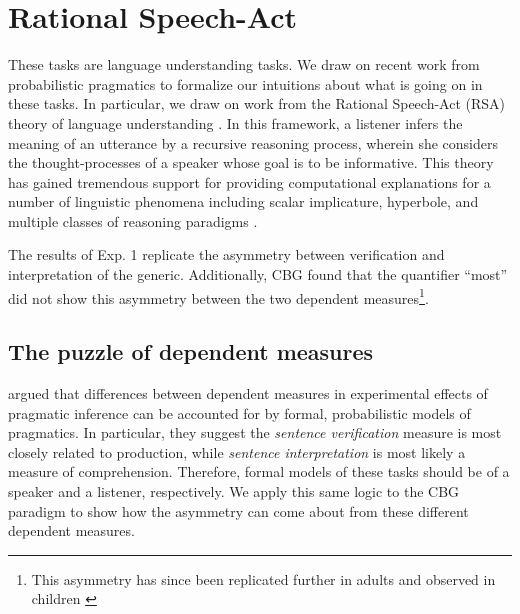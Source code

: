 \documentclass[10pt,letterpaper]{article}
\begin{document}

\section{Rational Speech-Act}


These tasks are language understanding tasks. We draw on recent work from probabilistic pragmatics to formalize our intuitions about what is going on in these tasks. In particular, we draw on work from the Rational Speech-Act (RSA) theory of language understanding \cite{Frank2012}. In this framework, a listener infers the meaning of an utterance by a recursive reasoning process, wherein she considers the thought-processes of a speaker whose goal is to be informative. This theory has gained tremendous support for providing computational explanations for a number of linguistic phenomena including scalar implicature, hyperbole, and multiple classes of reasoning paradigms \cite{Goodman2013, Kao2014, Tessler2014, Lassiter2014}. 

The results of Exp. 1 replicate the asymmetry between verification and interpretation of the generic. Additionally, CBG  found that the quantifier ``most'' did not show this asymmetry between the two dependent measures\footnote{This asymmetry has since been replicated further in adults and observed in children \cite{Brandone2014}}. 

\subsection{The puzzle of dependent measures}

 argued that differences between dependent measures in experimental effects of pragmatic inference can be accounted for by formal, probabilistic models of pragmatics. In particular, they suggest the \emph{sentence verification} measure is most closely related to production, while \emph{sentence interpretation} is most likely a measure of comprehension. Therefore, formal models of these tasks should be of a speaker and a listener, respectively. We apply this same logic to the CBG paradigm to show how the asymmetry can come about from these different dependent measures.
\end{document}
